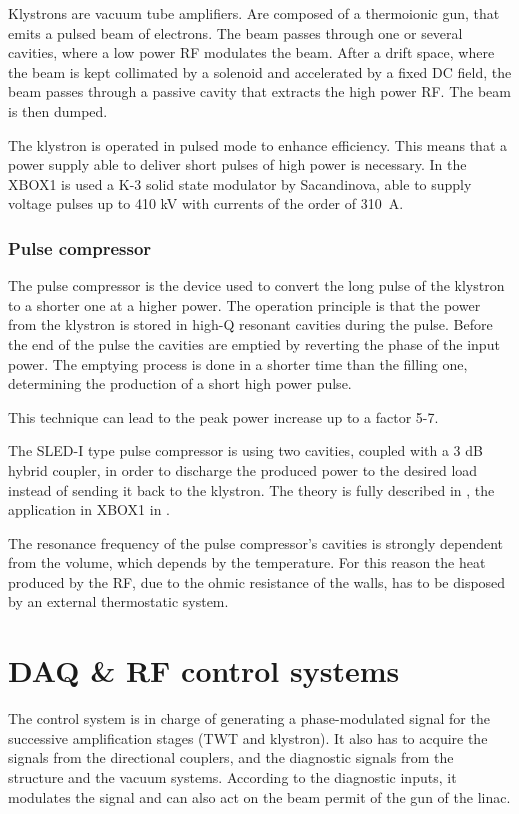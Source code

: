 Klystrons are vacuum tube amplifiers. Are composed of a thermoionic gun, that emits a pulsed beam of electrons. The beam passes through one or several cavities, where a low power RF modulates the beam. After a drift space, where the beam is kept collimated by a solenoid and accelerated by a fixed DC field, the beam passes through a passive cavity that extracts the high power RF. The beam is then dumped. 

The klystron is operated in pulsed mode to enhance efficiency. This means that a power supply able to deliver short pulses of high power is necessary. In the XBOX1 is used a K-3 solid state modulator by Sacandinova, able to supply voltage pulses up to 410 kV with currents of the order of 310~A.


\subsubsection{Pulse compressor}

The pulse compressor is the device used to convert the long pulse of the klystron to a shorter one at a higher power. The operation principle is that the power from the klystron is stored in high-Q resonant cavities during the pulse. Before the end of the pulse the cavities are emptied by reverting the phase of the input power. The emptying process is done in a shorter time than the filling one, determining the production of a short high power pulse. 

This technique can lead to the peak power increase up to a factor 5-7. 

The SLED-I type pulse compressor is using two cavities, coupled with a 3 dB hybrid coupler, in order to discharge the produced power to the desired load instead of sending it back to the klystron. The theory is fully described in \cite{Fiebig:209756}, the application in XBOX1 in \cite{SLED:ctf3}.

The resonance frequency of the pulse compressor's cavities is strongly dependent from the volume, which depends by the temperature. For this reason the heat produced by the RF, due to the ohmic resistance of the walls, has to be disposed by an external thermostatic system.

 


\section[DAQ \& RF control systems]{DAQ \& RF control systems}

The control system is in charge of generating a phase-modulated signal for the successive amplification stages (TWT and klystron). It also has to acquire the signals from the directional couplers, and the diagnostic signals from the structure and the vacuum systems. According to the diagnostic inputs, it modulates the signal and can also act on the beam permit of the gun of the linac. 

